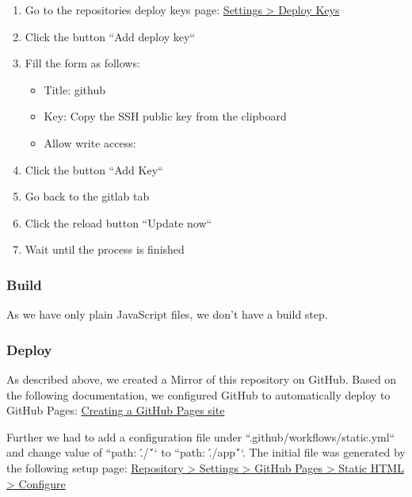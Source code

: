 \begin{enumerate}
    \item Go to the repositories deploy keys page: \href{https://github.com/decibel-threshold-event-displayer/decibel-threshold-event-displayer.github.io/settings/keys}{Settings > Deploy Keys}
    \item Click the button ``Add deploy key``
    \item Fill the form as follows:
          \begin{itemize}
              \item Title: github
              \item Key: Copy the SSH public key from the clipboard
              \item Allow write access:
          \end{itemize}
    \item Click the button ``Add Key``
    \item Go back to the gitlab tab
    \item Click the reload button ``Update now``
    \item Wait until the process is finished
\end{enumerate}

\subsubsection{Build}
As we have only plain JavaScript files, we don't have a build step.

\subsubsection{Deploy}
As described above, we created a Mirror of this repository on GitHub.
Based on the following documentation, we configured GitHub to automatically deploy to GitHub Pages:
\href{https://docs.github.com/en/pages/getting-started-with-github-pages/creating-a-github-pages-site}{Creating a GitHub Pages site}

Further we had to add a configuration file under ``.github/workflows/static.yml`` and change value of ``path: \'./\'`` to ``path: \'./app\'``.
The initial file was generated by the following setup page:
\href{https://github.com/decibel-threshold-event-displayer/decibel-threshold-event-displayer.github.io/new/main?filename=.github%2Fworkflows%2Fstatic.yml&pages_workflow_template=pages%2Fstatic}{Repository > Settings > GitHub Pages > Static HTML > Configure}

